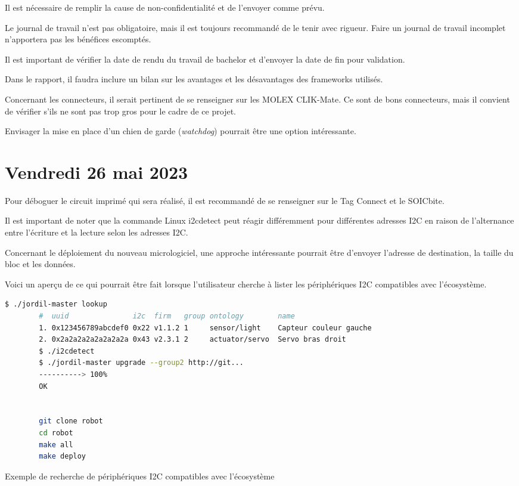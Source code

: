 Il est nécessaire de remplir la cause de non-confidentialité et de l'envoyer comme prévu.

Le journal de travail n'est pas obligatoire, mais il est toujours recommandé de le tenir avec rigueur. Faire un journal de travail incomplet n'apportera pas les bénéfices escomptés.

Il est important de vérifier la date de rendu du travail de bachelor et d'envoyer la date de fin pour validation.

Dans le rapport, il faudra inclure un bilan sur les avantages et les désavantages des frameworks utilisés.

Concernant les connecteurs, il serait pertinent de se renseigner sur les MOLEX CLIK-Mate. Ce sont de bons connecteurs, mais il convient de vérifier s'ils ne sont pas trop gros pour le cadre de ce projet.

Envisager la mise en place d'un chien de garde (\textit{watchdog}) pourrait être une option intéressante.

\section{Vendredi 26 mai 2023}

Pour déboguer le circuit imprimé qui sera réalisé, il est recommandé de se renseigner sur le Tag Connect et le SOICbite.

Il est important de noter que la commande Linux i2cdetect peut réagir différemment pour différentes adresses I2C en raison de l'alternance entre l'écriture et la lecture selon les adresses I2C.

Concernant le déploiement du nouveau micrologiciel, une approche intéressante pourrait être d'envoyer l'adresse de destination, la taille du bloc et les données.

Voici un aperçu de ce qui pourrait être fait lorsque l'utilisateur cherche à lister les périphériques I2C compatibles avec l'écosystème.

\begin{listing}[!h]
    \begin{lstlisting}[language=bash]
        $ ./jordil-master lookup
        #  uuid               i2c  firm   group ontology        name
        1. 0x123456789abcdef0 0x22 v1.1.2 1     sensor/light    Capteur couleur gauche
        2. 0x2a2a2a2a2a2a2a2a 0x43 v2.3.1 2     actuator/servo  Servo bras droit
        $ ./i2cdetect
        $ ./jordil-master upgrade --group2 http://git... 
        ----------> 100%
        OK
        
        
        git clone robot
        cd robot
        make all
        make deploy
    \end{lstlisting}
    \caption{Exemple de recherche de périphériques I2C compatibles avec l'écosystème}
\end{listing}

